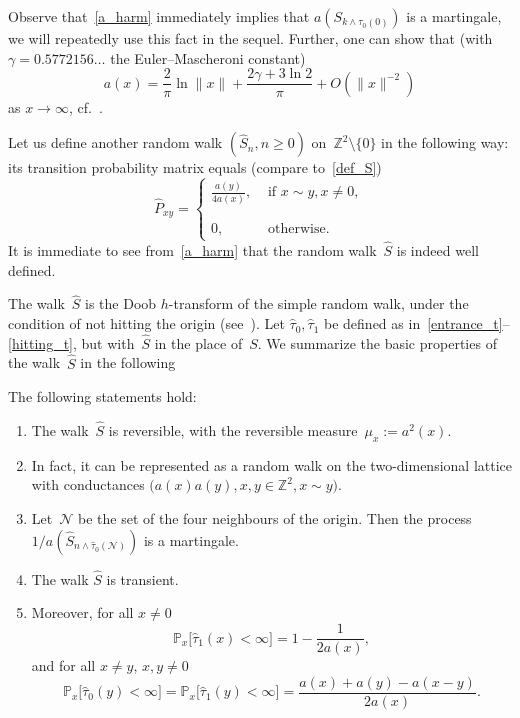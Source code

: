 \documentclass[AHL,Unicode,longabstracts]{cedram}
\newcommand{\1}[1]{{\mathbf 1}{\{#1\}}}
\newcommand{\Z}{\mathbb{Z}}
\newcommand{\s}{{\widehat S}}
\newcommand{\8}{{\infty}}
\newcommand{\IP}{{\mathbb P}}
\newcommand{\hP}{\widehat{P}}
\newcommand{\htau}{\widehat{\tau}}
\begin{document}
Observe that~\eqref{a_harm} immediately implies that $a(S_{k\wedge \tau_0(0)})$ is a martingale, we will repeatedly use this fact in the sequel. Further, one can show that (with $\gamma=0.5772156\dots$ the Euler--Mascheroni constant)
\begin{equation}\label{formula_for_a}
a(x) = \frac{2}{\pi}\ln \|x\| + \frac{2\gamma+ 3\ln 2}{\pi} + O(\|x\|^{-2})
\end{equation}
as $x\to\infty$, cf.~\cite[Theorem~4.4.4]{LL10}.

Let us define another random walk $(\s_n, n\geq 0)$ on~$\Z^2\setminus \{0\}$ in the following way: its transition probability matrix equals (compare to~\eqref{def_S})
\begin{equation}\label{def_hatS}
\hP_{xy} =
\begin{cases}
\displaystyle\frac{a(y)}{4a(x)}, & \text{ if } x\sim y, x\neq 0,\\
0,\phantom{\int\limits^A} & \text{ otherwise.}
\end{cases}
\end{equation}
It is immediate to see from~\eqref{a_harm} that the random walk~$\s$ is indeed well defined.

The walk~$\s$ is the Doob $h$-transform of the simple random walk, under the condition of not hitting the origin (see~\cite[Lemma~3.3 and its proof]{CPV16}). Let $\htau_0, \htau_1$ be defined as in~\eqref{entrance_t}--\eqref{hitting_t}, but with~$\s$ in the place of~$S$. We summarize the basic properties of the walk~$\s$ in the following

\begin{prop}\label{p_basic_prop}
The following statements hold:
\begin{enumerate}
\item \label{1.1.1} The walk~$\s$ is reversible, with the reversible measure~$\mu_x:=a^2(x)$.
\item \label{1.1.2} In fact, it can be represented as a random walk on the two-dimensional lattice with conductances $\big(a(x)a(y), x,y\in \Z^2, x\sim y\big)$.
\item \label{1.1.3} Let~$\mathcal{N}$ be the set of the four neighbours of the origin. Then the process $1/a(\s_{n\wedge \htau_0(\mathcal{N})})$ is a martingale.
\item \label{1.1.4} The walk $\s$ is transient.
\item \label{1.1.5} Moreover, for all $x\neq 0$
\begin{equation}\label{escape_from_site}
\IP_x\big[\htau_1(x)<\infty\big] = 1-\frac{1}{2a(x)},
\end{equation}
and for all $x\neq y$, $x,y\neq 0$
\begin{equation}\label{not_hit_site}
\IP_x\big[\htau_0(y)<\infty\big] =
\IP_x\big[\htau_1(y)<\infty\big] = \frac{a(x)+a(y)-a(x-y)}{2a(x)}.
\end{equation}
\end{enumerate}
\end{prop}
\end{document}

